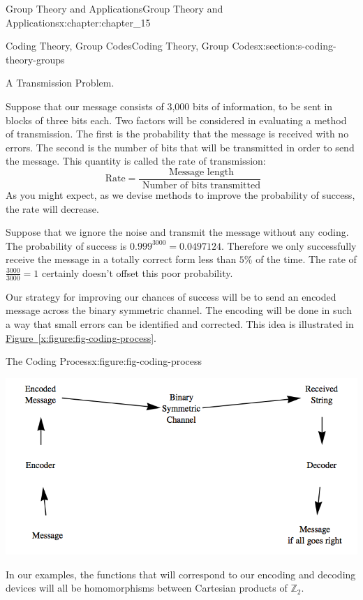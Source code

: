 \documentclass[oneside,10pt,]{book}
\newcommand{\xreffont}{\relax}
\numberwithin{equation}{section}
\begin{document}
\begin{chapterptx}{Group Theory and Applications}{}{Group Theory and Applications}{}{}{x:chapter:chapter_15}
\begin{sectionptx}{Coding Theory, Group Codes}{}{Coding Theory, Group Codes}{}{}{x:section:s-coding-theory-groups}
\begin{introduction}{A Transmission Problem.}
\par
Suppose that our message consists of 3,000 bits of information, to be sent in blocks of three bits each. Two factors will be considered in evaluating a method of transmission. The first is the probability that the message is received with no errors. The second is the number of bits that will be transmitted in order to send the message. This quantity is called the rate of transmission:%
\begin{equation*}
\textrm{ Rate}= \frac{\textrm{ Message length}}{\textrm{ Number of bits transmitted}}
\end{equation*}
As you might expect, as we devise methods to improve the probability of success, the rate will decrease.%
\par
Suppose that we ignore the noise and transmit the message without any coding. The probability of success is \(0.999^{3000}= 0.0497124\).  Therefore we only successfully receive the message in a totally correct form less than \(5\%\) of the time.  The rate of \(\frac{3000}{3000} = 1\) certainly doesn't offset this poor probability.%
\par
Our strategy  for improving our chances of success will be to send an encoded message across the binary symmetric channel. The encoding will be done in such a way that small errors can be identified and corrected. This idea is illustrated in \hyperref[x:figure:fig-coding-process]{Figure~{\xreffont\ref{x:figure:fig-coding-process}}}.%
\begin{figureptx}{The Coding Process}{x:figure:fig-coding-process}{}%
\begin{image}{0.1}{0.8}{0.1}%
\includegraphics[width=\linewidth]{images/fig-coding-process.png}
\end{image}%
\tcblower
\end{figureptx}%
In our examples, the functions that will correspond to our encoding and decoding devices will all be homomorphisms between Cartesian products of \(\mathbb{Z}_2\).%

\end{introduction}
\end{sectionptx}
\end{chapterptx}
\end{document}
